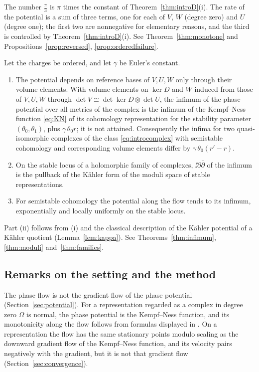 The number $\frac\pi3$ is $\pi$ times the constant of
Theorem~\ref{thm:introD}(i). The rate of the potential is a sum of three
terms, one for each of $V$, $W$ (degree zero) and $U$ (degree one); the first
two are nonnegative for elementary reasons, and the third is controlled by
Theorem~\ref{thm:introD}(i). See Theorem~\ref{thm:monotone} and
Propositions~\ref{prop:reversed}, \ref{prop:orderedfailure}.

\begin{theorem}\label{thm:introF}
Let the charges be ordered, and let $\gamma$ be Euler's constant.
\begin{enumerate}
\item[(i)] The potential depends on reference bases of $V,U,W$ only through
 their volume elements. With volume elements on $\ker D$ and $W$ induced
 from those of $V,U,W$ through $\det V\cong\det\ker D\otimes\det U$, the
 infimum of the phase potential over all metrics of the complex is the
 infimum of the Kempf--Ness function \eqref{eq:KN} of its cohomology
 representation for the stability parameter $(\theta_0,\theta_1)$, plus
 $\gamma\,\theta_0r$; it is not attained. Consequently
 the infima for two quasi-isomorphic complexes of the class
 \eqref{eq:introcomplex} with semistable cohomology and corresponding volume
 elements differ by $\gamma\,\theta_0(r'-r)$.
\item[(ii)] On the stable locus of a holomorphic family of complexes,
 $\ii\partial\bar\partial$ of the infimum is the pullback of the K\"ahler form
 of the moduli space of stable representations.
\item[(iii)] For semistable cohomology the potential along the flow tends to
 its infimum, exponentially and locally uniformly on the stable locus.
\end{enumerate}
\end{theorem}

Part (ii) follows from (i) and the classical description of the K\"ahler
potential of a K\"ahler quotient (Lemma~\ref{lem:kappa}). See
Theorems~\ref{thm:infimum}, \ref{thm:moduli} and~\ref{thm:families}.

\subsection{Remarks on the setting and the method}
The phase flow is not the gradient flow of the phase potential
(Section~\ref{sec:potential}). For a representation
regarded as a complex in degree zero $\Omega$ is normal, the phase
potential is the Kempf--Ness function, and its monotonicity along the flow
follows from formulas displayed in \cite[\S\S4.2, 5.1]{hkkp26}. On a
representation the flow has the same stationary points modulo scaling as the
downward gradient flow of the Kempf--Ness function, and its velocity pairs
negatively with the gradient, but it is not that gradient flow
(Section~\ref{sec:convergence}).

